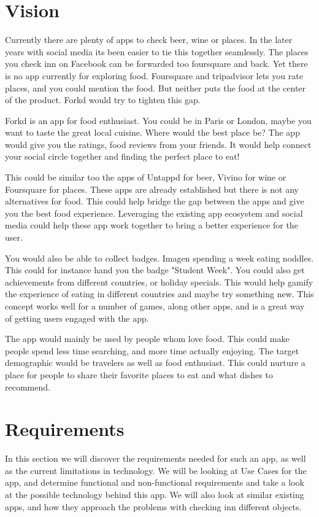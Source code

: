 \documentclass[12pt]{article}
\begin{document}
\clearpage

\setlength{\parskip}{0.2in}

\section{Vision}
Currently there are plenty of apps to check beer, wine or places. In the later
years with social media its been easier to tie this together seamlessly. The
places you check inn on Facebook can be forwarded too foursquare and back. Yet
there is no app currently for exploring food. Foursquare and tripadvisor lets
you rate places, and you could mention the food. But neither puts the food at
the center of the product. Forkd would try to tighten this gap.

Forkd is an app for food enthusiast. You could be in Paris or London, maybe you
want to taste the great local cuisine.  Where would the best place be? The app
would give you the ratings, food reviews from your friends. It would help
connect your social circle together and finding the perfect place to eat!

This could be similar too the apps of Untappd for beer, Vivino for wine or
Foursquare for places. These apps are already established but there is not any
alternatives for food. This could help bridge the gap between the apps and give
you the best food experience. Leveraging the existing app ecosystem and social
media could help these app work together to bring a better experience for the
user.

You would also be able to collect badges. Imagen spending a week eating noddles.
This could for instance hand you the badge "Student Week". You could also get
achievements from different countries, or holiday specials. This would help
gamify the experience of eating in different countries and maybe try something
new. This concept works well for a number of games, along other apps, and is a
great way of getting users engaged with the app.

The app would mainly be used by people whom love food. This could make people
spend less time searching, and more time actually enjoying. The target
demographic would be travelers as well as food enthusiast. This could nurture a
place for people to share their favorite places to eat and what dishes to
recommend.


\section{Requirements}
In this section we will discover the requirements needed for such an app, as
well as the current limitations in technology. We will be looking at Use Cases
for the app, and determine functional and non-functional requirements and take a
look at the possible technology behind this app. We will also look at similar
existing apps, and how they approach the problems with checking inn different
objects.
\end{document}
